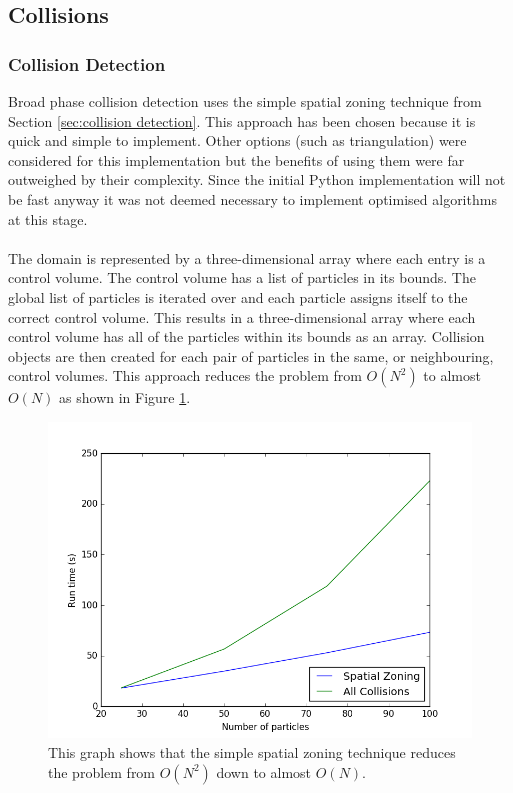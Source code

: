 \documentclass[a4paper,11pt,titlepage]{report}
\begin{document}
\subsection{Collisions}
\subsubsection{Collision Detection}
\label{sec:Python Collision Detection}
Broad phase collision detection uses the simple spatial zoning technique from Section \ref{sec:collision detection}. This approach has been chosen because it is quick and simple to implement. Other options (such as triangulation\cite{dynamictriangulations}) were considered for this implementation but the benefits of using them were far outweighed by their complexity. Since the initial Python implementation will not be fast anyway it was not deemed necessary to implement optimised algorithms at this stage.
\\\\The domain is represented by a three-dimensional array where each entry is a control volume. The control volume has a list of particles in its bounds. The global list of particles is iterated over and each particle assigns itself to the correct control volume. This results in a three-dimensional array where each control volume has all of the particles within its bounds as an array. Collision objects are then created for each pair of particles in the same, or neighbouring, control volumes. This approach reduces the problem from $O(N^{2})$ to almost $O(N)$ as shown in Figure \ref{fig:run_time_against_N_python}.
\begin{figure}[!ht]
\centering
\includegraphics[scale=0.65]{figures/RunTimeAgainstNumberOfParticlesPython.png}
\caption{This graph shows that the simple spatial zoning technique reduces the problem from $O(N^{2})$ down to almost $O(N)$.}
\label{fig:run_time_against_N_python}
\end{figure}
\end{document}
